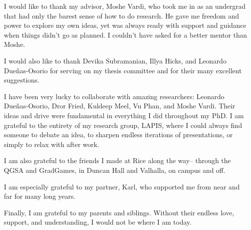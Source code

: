 \acknowledge
I would like to thank my advisor, Moshe Vardi, who took me in as an undergrad that had only the barest sense of how to do research.
He gave me freedom and power to explore my own ideas, yet was always ready with support and guidance when things didn't go as planned.
I couldn't have asked for a better mentor than Moshe.

I would also like to thank Devika Subramanian, Illya Hicks, and Leonardo Due{\~n}as-Osorio for serving on my thesis committee and for their many excellent suggestions.

I have been very lucky to collaborate with amazing researchers: Leonardo Due{\~n}as-Osorio, Dror Fried, Kuldeep Meel, Vu Phan, and Moshe Vardi.
Their ideas and drive were fundamental in everything I did throughout my PhD.
I am grateful to the entirety of my research group, LAPIS, where I could always find someone to debate an idea, to sharpen endless iterations of presentations, or simply to relax with after work.

I am also grateful to the friends I made at Rice along the way-- through the QGSA and GradGames, in Duncan Hall and Valhalla, on campus and off. 

I am especially grateful to my partner, Karl, who supported me from near and far for many long years.

Finally, I am grateful to my parents and siblings. Without their endless love, support, and understanding, I would not be where I am today.